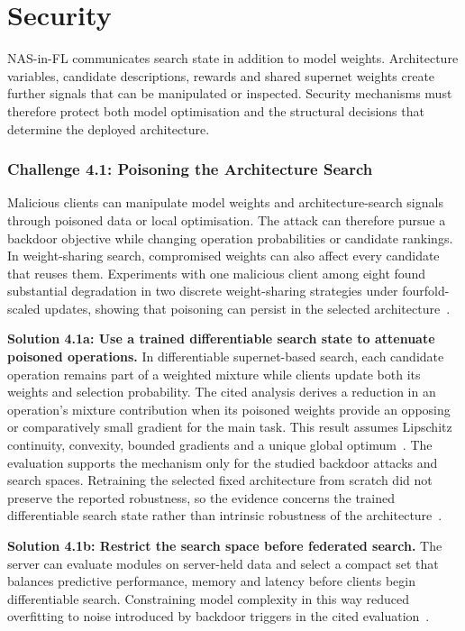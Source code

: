 \section{Security}

NAS-in-FL communicates search state in addition to model weights. Architecture variables, candidate descriptions, rewards and shared supernet weights create further signals that can be manipulated or inspected. Security mechanisms must therefore protect both model optimisation and the structural decisions that determine the deployed architecture.

\subsubsection{Challenge 4.1: Poisoning the Architecture Search}

Malicious clients can manipulate model weights and architecture-search signals through poisoned data or local optimisation. The attack can therefore pursue a backdoor objective while changing operation probabilities or candidate rankings. In weight-sharing search, compromised weights can also affect every candidate that reuses them. Experiments with one malicious client among eight found substantial degradation in two discrete weight-sharing strategies under fourfold-scaled updates, showing that poisoning can persist in the selected architecture~\cite{privacy_preserving_fednas_for_edge_2025}.

\noindent\textbf{Solution 4.1a: Use a trained differentiable search state to attenuate poisoned operations.} In differentiable supernet-based search, each candidate operation remains part of a weighted mixture while clients update both its weights and selection probability. The cited analysis derives a reduction in an operation's mixture contribution when its poisoned weights provide an opposing or comparatively small gradient for the main task. This result assumes Lipschitz continuity, convexity, bounded gradients and a unique global optimum~\cite{privacy_preserving_fednas_for_edge_2025}. The evaluation supports the mechanism only for the studied backdoor attacks and search spaces. Retraining the selected fixed architecture from scratch did not preserve the reported robustness, so the evidence concerns the trained differentiable search state rather than intrinsic robustness of the architecture~\cite{privacy_preserving_fednas_for_edge_2025}.

\noindent\textbf{Solution 4.1b: Restrict the search space before federated search.} The server can evaluate modules on server-held data and select a compact set that balances predictive performance, memory and latency before clients begin differentiable search. Constraining model complexity in this way reduced overfitting to noise introduced by backdoor triggers in the cited evaluation~\cite{privacy_preserving_fednas_for_edge_2025}.

